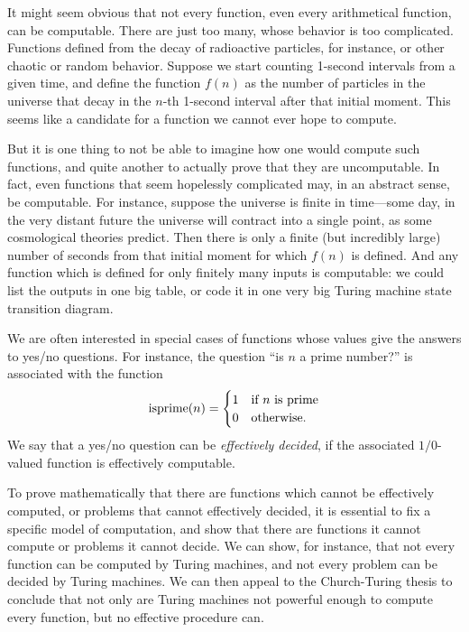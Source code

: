 \documentclass[../../../include/open-logic-section]{subfiles}
\begin{document}

It might seem obvious that not every function, even every arithmetical
function, can be computable. There are just too many, whose behavior
is too complicated.  Functions defined from the decay of radioactive
particles, for instance, or other chaotic or random behavior. Suppose
we start counting 1-second intervals from a given time, and define the
function $f(n)$ as the number of particles in the universe that decay
in the $n$-th 1-second interval after that initial moment.  This seems
like a candidate for a function we cannot ever hope to compute.

But it is one thing to not be able to imagine how one would compute
such functions, and quite another to actually prove that they are
uncomputable.  In fact, even functions that seem hopelessly
complicated may, in an abstract sense, be computable.  For instance,
suppose the universe is finite in time---some day, in the very distant
future the universe will contract into a single point, as some
cosmological theories predict. Then there is only a finite (but
incredibly large) number of seconds from that initial moment for which
$f(n)$ is defined.  And any function which is defined for only finitely
many inputs is computable: we could list the outputs in one big table,
or code it in one very big Turing machine state transition diagram.

We are often interested in special cases of functions whose values give
the answers to yes/no questions.  For instance, the question ``is $n$
a prime number?'' is associated with the function
\[
\fn{isprime}(n) = \begin{cases}
  1 & \text{if $n$ is prime}\\
  0 & \text{otherwise.}
  \end{cases}
\]
We say that a yes/no question can be \emph{effectively decided}, if
the associated $1/0$-valued function is effectively computable.

To prove mathematically that there are functions which cannot be
effectively computed, or problems that cannot effectively decided, it
is essential to fix a specific model of computation, and show
that there are functions it cannot compute or problems it cannot
decide.  We can show, for instance, that not every function can be
computed by Turing machines, and not every problem can be decided by
Turing machines.  We can then appeal to the Church-Turing thesis to
conclude that not only are Turing machines not powerful enough to
compute every function, but no effective procedure can.
\end{document}
